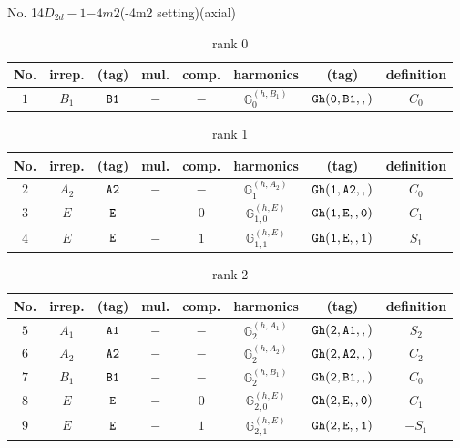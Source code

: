 \documentclass[fleqn,8pt]{jsarticle}
\begin{document}
\setcounter{MaxMatrixCols}{16}

\begin{center}
\LARGE
No. 14\quad$D_{2d}-1$\quad$-4m2$\quad(-4m2 setting)\quad[ tetragonal ] (axial)
\end{center}
\begin{table}[ht!]
\begin{center}
\caption{rank 0}
\renewcommand{\arraystretch}{1.3}
\begin{tabular}{cccccccc} \hline \hline
No. & irrep. & (tag) & mul. & comp. & harmonics & (tag) & definition \\ \hline
$ 1 $ & $ B_{1} $ & $ {\tt B1} $ & $ - $ & $ - $ & $ \mathbb{G}_{0}^{(h,B_{1})} $ & $ {\tt Gh(0,B1,,)} $ & $ C_{0} $ \\
 \hline \hline
\end{tabular}
\end{center}
\end{table}
\begin{table}[ht!]
\begin{center}
\caption{rank 1}
\renewcommand{\arraystretch}{1.3}
\begin{tabular}{cccccccc} \hline \hline
No. & irrep. & (tag) & mul. & comp. & harmonics & (tag) & definition \\ \hline
$ 2 $ & $ A_{2} $ & $ {\tt A2} $ & $ - $ & $ - $ & $ \mathbb{G}_{1}^{(h,A_{2})} $ & $ {\tt Gh(1,A2,,)} $ & $ C_{0} $ \\
$ 3 $ & $ E $ & $ {\tt E} $ & $ - $ & $ 0 $ & $ \mathbb{G}_{1,0}^{(h,E)} $ & $ {\tt Gh(1,E,,0)} $ & $ C_{1} $ \\
$ 4 $ & $ E $ & $ {\tt E} $ & $ - $ & $ 1 $ & $ \mathbb{G}_{1,1}^{(h,E)} $ & $ {\tt Gh(1,E,,1)} $ & $ S_{1} $ \\
 \hline \hline
\end{tabular}
\end{center}
\end{table}
\begin{table}[ht!]
\begin{center}
\caption{rank 2}
\renewcommand{\arraystretch}{1.3}
\begin{tabular}{cccccccc} \hline \hline
No. & irrep. & (tag) & mul. & comp. & harmonics & (tag) & definition \\ \hline
$ 5 $ & $ A_{1} $ & $ {\tt A1} $ & $ - $ & $ - $ & $ \mathbb{G}_{2}^{(h,A_{1})} $ & $ {\tt Gh(2,A1,,)} $ & $ S_{2} $ \\
$ 6 $ & $ A_{2} $ & $ {\tt A2} $ & $ - $ & $ - $ & $ \mathbb{G}_{2}^{(h,A_{2})} $ & $ {\tt Gh(2,A2,,)} $ & $ C_{2} $ \\
$ 7 $ & $ B_{1} $ & $ {\tt B1} $ & $ - $ & $ - $ & $ \mathbb{G}_{2}^{(h,B_{1})} $ & $ {\tt Gh(2,B1,,)} $ & $ C_{0} $ \\
$ 8 $ & $ E $ & $ {\tt E} $ & $ - $ & $ 0 $ & $ \mathbb{G}_{2,0}^{(h,E)} $ & $ {\tt Gh(2,E,,0)} $ & $ C_{1} $ \\
$ 9 $ & $ E $ & $ {\tt E} $ & $ - $ & $ 1 $ & $ \mathbb{G}_{2,1}^{(h,E)} $ & $ {\tt Gh(2,E,,1)} $ & $ - S_{1} $ \\
 \hline \hline
\end{tabular}
\end{center}
\end{table}
\end{document}
